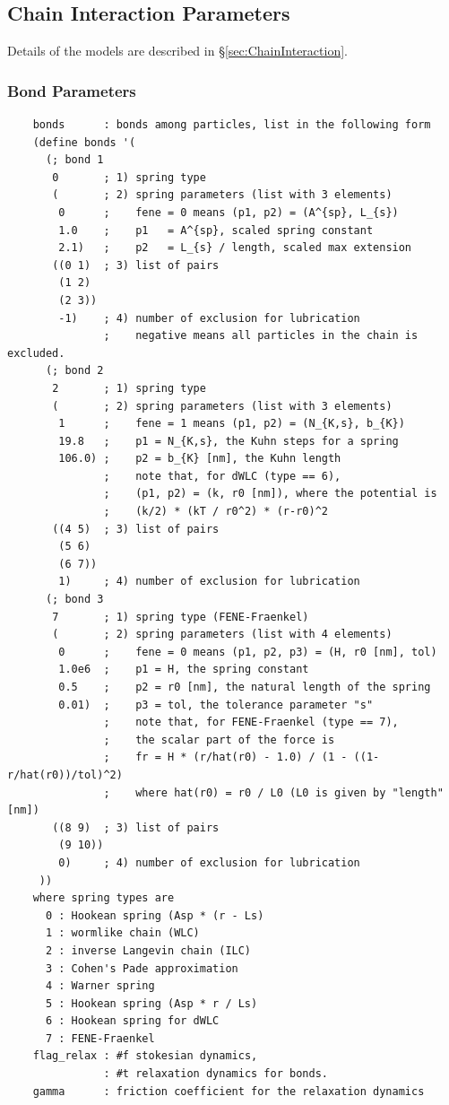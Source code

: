 \documentclass{book}
\begin{document}
\subsection{Chain Interaction Parameters}
Details of the models are described in 
\S \ref{sec:ChainInteraction}. 
\subsubsection{Bond Parameters}
{\small
\begin{verbatim}
	bonds      : bonds among particles, list in the following form
	(define bonds '(
	  (; bond 1
	   0       ; 1) spring type
	   (       ; 2) spring parameters (list with 3 elements)
	    0      ;    fene = 0 means (p1, p2) = (A^{sp}, L_{s})
	    1.0    ;    p1   = A^{sp}, scaled spring constant
	    2.1)   ;    p2   = L_{s} / length, scaled max extension
	   ((0 1)  ; 3) list of pairs
	    (1 2)
	    (2 3))
	    -1)    ; 4) number of exclusion for lubrication
	           ;    negative means all particles in the chain is excluded.
	  (; bond 2
	   2       ; 1) spring type
	   (       ; 2) spring parameters (list with 3 elements)
	    1      ;    fene = 1 means (p1, p2) = (N_{K,s}, b_{K})
	    19.8   ;    p1 = N_{K,s}, the Kuhn steps for a spring
	    106.0) ;    p2 = b_{K} [nm], the Kuhn length
	           ;    note that, for dWLC (type == 6),
	           ;    (p1, p2) = (k, r0 [nm]), where the potential is
	           ;    (k/2) * (kT / r0^2) * (r-r0)^2
	   ((4 5)  ; 3) list of pairs
	    (5 6)
	    (6 7))
	    1)     ; 4) number of exclusion for lubrication
	  (; bond 3
	   7       ; 1) spring type (FENE-Fraenkel)
	   (       ; 2) spring parameters (list with 4 elements)
	    0      ;    fene = 0 means (p1, p2, p3) = (H, r0 [nm], tol)
	    1.0e6  ;    p1 = H, the spring constant
	    0.5    ;    p2 = r0 [nm], the natural length of the spring
	    0.01)  ;    p3 = tol, the tolerance parameter "s"
	           ;    note that, for FENE-Fraenkel (type == 7),
	           ;    the scalar part of the force is
	           ;    fr = H * (r/hat(r0) - 1.0) / (1 - ((1-r/hat(r0))/tol)^2)
	           ;    where hat(r0) = r0 / L0 (L0 is given by "length" [nm])
	   ((8 9)  ; 3) list of pairs
	    (9 10))
	    0)     ; 4) number of exclusion for lubrication
	 ))
	where spring types are
	  0 : Hookean spring (Asp * (r - Ls)
	  1 : wormlike chain (WLC)
	  2 : inverse Langevin chain (ILC)
	  3 : Cohen's Pade approximation
	  4 : Warner spring
	  5 : Hookean spring (Asp * r / Ls)
	  6 : Hookean spring for dWLC
	  7 : FENE-Fraenkel
	flag_relax : #f stokesian dynamics,
	           : #t relaxation dynamics for bonds.
	gamma      : friction coefficient for the relaxation dynamics
\end{verbatim}
}
\end{document}
